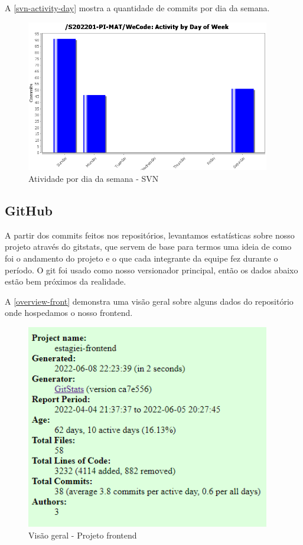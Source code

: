 A \autoref{svn-activity-day} mostra a quantidade de commits por dia da semana.
\begin{figure}[H]
	\centering
	\caption{\label{svn-activity-day}Atividade por dia da semana - SVN}
	\includegraphics[width=0.95\textwidth]{../imagens/stats/svn-activity-day.png}
\end{figure}

\subsection{GitHub}
A partir dos commits feitos nos repositórios, levantamos estatísticas sobre nosso projeto através do \gls{gitstats}, que servem de base para termos uma ideia de como foi o andamento do projeto e o que cada integrante da equipe fez durante o período.
O \gls{git} foi usado como nosso versionador principal, então os dados abaixo estão bem próximos da realidade.

A \autoref{overview-front} demonstra uma visão geral sobre alguns dados do repositório onde hospedamos o nosso \gls{frontend}.
\begin{figure}[H]
	\centering
	\caption{\label{overview-front}Visão geral - Projeto \gls{frontend}}
	\includegraphics[width=0.95\textwidth]{../imagens/stats/overview-frontend.png}
\end{figure}

